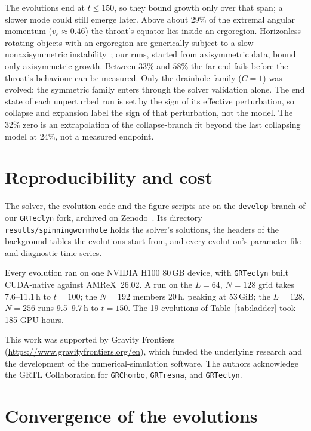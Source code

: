 \documentclass[twocolumn,floatfix,aps,prd,superscriptaddress,nofootinbib]{revtex4-2}
\begin{document}
The evolutions end at $t\le150$, so they bound growth only over that span; a slower mode could still emerge later. Above about $29\%$ of the extremal angular momentum ($v_e\approx0.46$) the throat's equator lies inside an ergoregion. Horizonless rotating objects with an ergoregion are generically subject to a slow nonaxisymmetric instability~\cite{friedman1978,cardoso2008}; our runs, started from axisymmetric data, bound only axisymmetric growth. Between $33\%$ and $58\%$ the far end fails before the throat's behaviour can be measured. Only the drainhole family ($C=1$) was evolved; the symmetric family enters through the solver validation alone. The end state of each unperturbed run is set by the sign of its effective perturbation, so collapse and expansion label the sign of that perturbation, not the model. The $32\%$ zero is an extrapolation of the collapse-branch fit beyond the last collapsing model at $24\%$, not a measured endpoint.

\section{Reproducibility and cost}
\label{sec:data}

The solver, the evolution code and the figure scripts are on the \texttt{develop} branch of our \texttt{GRTeclyn} fork, archived on Zenodo~\cite{shirokov2026code}. Its directory \texttt{results/spinningwormhole} holds the solver's solutions, the headers of the background tables the evolutions start from, and every evolution's parameter file and diagnostic time series.

Every evolution ran on one NVIDIA H100 80\,GB device, with \texttt{GRTeclyn} built CUDA-native against AMReX~26.02. A run on the $L=64$, $N=128$ grid takes 7.6--11.1\,h to $t=100$; the $N=192$ members 20\,h, peaking at 53\,GiB; the $L=128$, $N=256$ runs 9.5--9.7\,h to $t=150$. The 19 evolutions of Table~\ref{tab:ladder} took 185 GPU-hours.

\begin{acknowledgments}
This work was supported by Gravity Frontiers
(\url{https://www.gravityfrontiers.org/en}), which funded the underlying
research and the development of the numerical-simulation software. The authors
acknowledge the GRTL Collaboration for \texttt{GRChombo}, \texttt{GRTresna},
and \texttt{GRTeclyn}.
\end{acknowledgments}

\appendix

\section{Convergence of the evolutions}
\label{app:conv}
\end{document}
